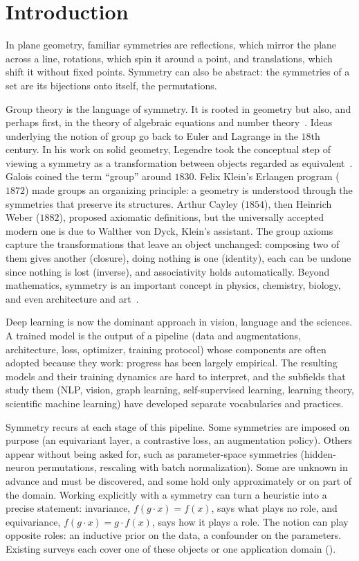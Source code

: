 \documentclass[mathematics,review,submit,moreauthors]{Definitions/mdpi}
\begin{document}
\section{Introduction}

In plane geometry, familiar symmetries are reflections, which mirror the plane across a line, rotations, which spin it around a point, and translations, which shift it without fixed points.
Symmetry can also be abstract: the symmetries of a set are its bijections onto itself, the permutations.

Group theory is the language of symmetry.
It is rooted in geometry but also, and perhaps first, in the theory of algebraic equations and number theory~\citep{wussing1984}.
Ideas underlying the notion of group go back to Euler and Lagrange in the $18$th century.
In his work on solid geometry, Legendre took the conceptual step of viewing a symmetry as a transformation between objects regarded as equivalent~\citep{legendre1794,hon2008fststmoarsc}.
Galois coined the term ``group'' around $1830$.
Felix Klein's Erlangen program ($1872$) made groups an organizing principle: a geometry is understood through the symmetries that preserve its structures.
Arthur Cayley ($1854$), then Heinrich Weber ($1882$), proposed axiomatic definitions, but the universally accepted modern one is due to Walther von Dyck, Klein's assistant.
The group axioms capture the transformations that leave an object unchanged: composing two of them gives another (closure), doing nothing is one (identity), each can be undone since nothing is lost (inverse), and associativity holds automatically.
Beyond mathematics, symmetry is an important concept in physics, chemistry, biology, and even architecture and art~\citep{weyl1952,makse2025}.

Deep learning is now the dominant approach in vision, language and the sciences.
A trained model is the output of a pipeline (data and augmentations, architecture, loss, optimizer, training protocol) whose components are often adopted because they work: progress has been largely empirical.
The resulting models and their training dynamics are hard to interpret, and the subfields that study them (NLP, vision, graph learning, self-supervised learning, learning theory, scientific machine learning) have developed separate vocabularies and practices.

Symmetry recurs at each stage of this pipeline.
Some symmetries are imposed on purpose (an equivariant layer, a contrastive loss, an augmentation policy).
Others appear without being asked for, such as parameter-space symmetries (hidden-neuron permutations, rescaling with batch normalization).
Some are unknown in advance and must be discovered, and some hold only approximately or on part of the domain.
Working explicitly with a symmetry can turn a heuristic into a precise statement: invariance, $f(g\cdot x)=f(x)$, says what plays no role, and equivariance, $f(g\cdot x)=g\cdot f(x)$, says how it plays a role.
The notion can play opposite roles: an inductive prior on the data, a confounder on the parameters.
Existing surveys each cover one of these objects or one application domain ().
\end{document}
